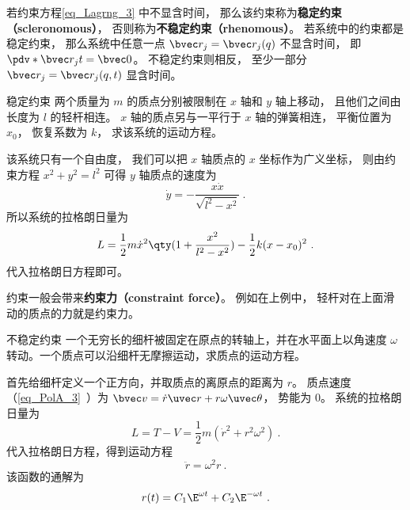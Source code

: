 若约束方程\autoref{eq_Lagrng_3} 中不显含时间， 那么该约束称为\textbf{稳定约束（scleronomous）}， 否则称为\textbf{不稳定约束（rhenomous）}。 若系统中的约束都是稳定约束， 那么系统中任意一点 $\bvec r_j = \bvec r_j(q)$ 不显含时间， 即 $\pdv*{\bvec r_j}{t} = \bvec 0$。 不稳定约束则相反， 至少一部分 $\bvec r_j = \bvec r_j(q, t)$ 显含时间。

\begin{example}{稳定约束}
两个质量为 $m$ 的质点分别被限制在 $x$ 轴和 $y$ 轴上移动， 且他们之间由长度为 $l$ 的轻杆相连。 $x$ 轴的质点另与一平行于 $x$ 轴的弹簧相连， 平衡位置为 $x_0$， 恢复系数为 $k$， 求该系统的运动方程。%

该系统只有一个自由度， 我们可以把 $x$ 轴质点的 $x$ 坐标作为广义坐标， 则由约束方程 $x^2 + y^2 = l^2$ 可得 $y$ 轴质点的速度为
\begin{equation}
\dot y = -\frac{x\dot x}{\sqrt{l^2 - x^2}}~.
\end{equation}
所以系统的拉格朗日量为
\begin{equation}
L = \frac12 m \dot x^2\qty(1 + \frac{x^2}{l^2 - x^2}) - \frac12 k (x-x_0)^2~.
\end{equation}
代入拉格朗日方程即可。
\end{example}
约束一般会带来\textbf{约束力（constraint force）}。 例如在上例中， 轻杆对在上面滑动的质点的力就是约束力。

\begin{example}{不稳定约束}\label{ex_Lagrng_3}
一个无穷长的细杆被固定在原点的转轴上，并在水平面上以角速度 $\omega$ 转动。一个质点可以沿细杆无摩擦运动，求质点的运动方程。

首先给细杆定义一个正方向，并取质点的离原点的距离为 $r$。 质点速度（\autoref{eq_PolA_3}~）为 $\bvec v = \dot r \uvec r + r\omega \uvec\theta$， 势能为 0。 系统的拉格朗日量为
\begin{equation}
L = T - V = \frac12 m(\dot r^2 + r^2 \omega^2)~.
\end{equation}
代入拉格朗日方程，得到运动方程
\begin{equation}
\ddot r = \omega^2 r~.
\end{equation}
该函数的通解为%
\begin{equation}
r(t) = C_1 \E^{\omega t} + C_2 \E^{-\omega t}~.
\end{equation}
\end{example}

